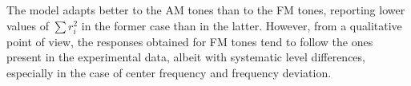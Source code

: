 \documentclass[../main.tex]{subfiles}
\begin{document}
\begin{modelchapter}
The model adapts better to the AM tones than to the FM tones, reporting lower
values of $\sum r_i^2$ in the former case than in the latter. However, from a
qualitative point of view, the responses obtained for FM tones tend to follow
the ones present in the experimental data, albeit with systematic level
differences, especially in the case of center frequency and frequency deviation.

\end{modelchapter}
\end{document}
